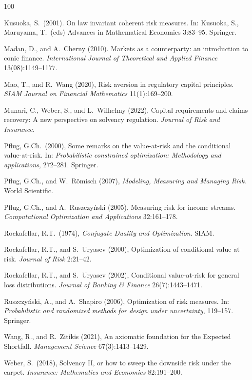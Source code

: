 \documentclass[12pt]{article}
\theoremstyle{plain}
\theoremstyle{definition}
\theoremstyle{remark}
\numberwithin{equation}{section}
\begin{document}
\begin{thebibliography}{100}
{ Kusuoka, S.\ (2001). On law invariant coherent risk measures. In: Kusuoka, S., Maruyama, T.\ (eds) Advances in Mathematical Economics 3:83--95. Springer.

 Madan, D., and A.\ Cherny (2010). Markets as a counterparty: an introduction to conic finance. {\em International Journal of Theoretical and Applied Finance} 13(08):1149--1177.

 Mao, T., and R.\ Wang (2020), Risk aversion in regulatory capital principles. {\em SIAM Journal on Financial Mathematics} 11(1):169--200.

 Munari, C., Weber, S., and L.\ Wilhelmy (2022), Capital requirements and claims recovery: A new perspective on solvency regulation. {\em Journal of Risk and Insurance}.

 Pflug, G.Ch.\ (2000), Some remarks on the value-at-risk and the conditional value-at-risk. In: {\em Probabilistic constrained optimization: Methodology and applications}, 272--281. Springer.

 Pflug, G.Ch., and W.\ R\"{o}misch (2007), \textit{Modeling, Measuring and Managing Risk}. World Scientific.

 Pflug, G.Ch., and A.\ Ruszczy\'{n}ski (2005), Measuring risk for income streams. {\em Computational Optimization and Applications} 32:161--178.

 Rockafellar, R.T.\ (1974), {\em Conjugate Duality and Optimization}. SIAM.

 Rockafellar, R.T., and S.\ Uryasev (2000), Optimization of conditional value-at-risk. \textit{Journal of Risk} 2:21--42.

 Rockafellar, R.T., and S.\ Uryasev (2002), Conditional value-at-risk for general loss distributions. \textit{Journal of Banking \& Finance} 26(7):1443--1471.

 Ruszczy\'{n}ski, A., and A.\ Shapiro (2006), Optimization of risk measures. In: {\em Probabilistic and randomized methods for design under uncertainty}, 119--157. Springer.

 Wang, R., and R.\ Zitikis (2021), An axiomatic foundation for the Expected Shortfall. {\em Management Science} 67(3):1413--1429.

 Weber, S.\ (2018), Solvency II, or how to sweep the downside risk under the carpet. {\em Insurance: Mathematics and Economics} 82:191--200.

}
\end{thebibliography}
\end{document}
